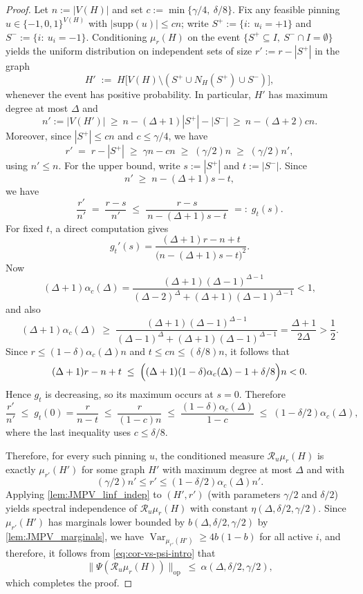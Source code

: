 \documentclass[11pt,reqno,letterpaper]{amsart}
\DeclareMathOperator*{\op}{\textrm{op}}
\newcommand{\supp}{\text{supp}}
\numberwithin{equation}{section}
\theoremstyle{definition}
\newcommand{\mc}{\mathcal}
\newcommand{\on}{\operatorname}
\begin{document}
\begin{proof}
Let $n:=|V(H)|$ and set $c:=\min\{\gamma/4,\ \delta/8\}$.
Fix any feasible pinning $u\in\{-1,0,1\}^{V(H)}$ with $|\supp(u)|\le cn$; write
$S^+:=\{i:\ u_i=+1\}$ and $S^-:=\{i:\ u_i=-1\}$.
Conditioning $\mu_r(H)$ on the event $\{S^+\subseteq I,\ S^-\cap I=\emptyset\}$ yields the uniform
distribution on independent sets of size $r':=r-|S^+|$ in the graph
\[
H' \;:=\; H\big[V(H)\setminus (S^+\cup N_H(S^+)\cup S^-)\big],
\]
whenever the event has positive probability.
In particular, $H'$ has maximum degree at most $\Delta$ and
\[
n':=|V(H')|
\ \ge\ n-(\Delta+1)|S^+|-|S^-|
\ \ge\ n-(\Delta+2)cn.
\]
Moreover, since $|S^+|\le cn$ and $c\le \gamma/4$, we have
\[
r' \;=\; r-|S^+| \;\ge\; \gamma n - cn \;\ge\; (\gamma/2)n \;\ge\; (\gamma/2)n',
\]
using $n'\le n$. For the upper bound, write $s:=|S^+|$ and $t:=|S^-|$. Since
\[
n' \;\ge\; n-(\Delta+1)s-t,
\]
we have
\[
\frac{r'}{n'}
\;=\;
\frac{r-s}{n'}
\;\le\;
\frac{r-s}{\,n-(\Delta+1)s-t\,}
\;=:\;
g_t(s).
\]
For fixed $t$, a direct computation gives
\[
g_t'(s)
=
\frac{(\Delta+1)r-n+t}{\bigl(n-(\Delta+1)s-t\bigr)^2}.
\]
Now
\[
(\Delta+1)\alpha_c(\Delta)
=
\frac{(\Delta+1)(\Delta-1)^{\Delta-1}}
{(\Delta-2)^{\Delta}+(\Delta+1)(\Delta-1)^{\Delta-1}}
<1,
\]
and also
\[
(\Delta+1)\alpha_c(\Delta)
\;\ge\;
\frac{(\Delta+1)(\Delta-1)^{\Delta-1}}
{(\Delta-1)^{\Delta}+(\Delta+1)(\Delta-1)^{\Delta-1}}
=
\frac{\Delta+1}{2\Delta}
>
\frac12.
\]
Since $r\le (1-\delta)\alpha_c(\Delta)n$ and $t\le cn\le (\delta/8)n$, it follows that
\[
(\Delta+1)r-n+t
\;\le\;
\Bigl((\Delta+1)(1-\delta)\alpha_c(\Delta)-1+\delta/8\Bigr)n
<0.
\]
Hence $g_t$ is decreasing, so its maximum occurs at $s=0$. Therefore
\[
\frac{r'}{n'}
\;\le\;
g_t(0)
=
\frac{r}{n-t}
\;\le\;
\frac{r}{(1-c)n}
\;\le\;
\frac{(1-\delta)\alpha_c(\Delta)}{1-c}
\;\le\;
(1-\delta/2)\alpha_c(\Delta),
\]
where the last inequality uses $c\le \delta/8$.


Therefore, for every such pinning $u$, the conditioned measure $\mc R_u\mu_r(H)$ is exactly
$\mu_{r'}(H')$ for some graph $H'$ with maximum degree at most $\Delta$ and with
\[
(\gamma/2)n' \le r' \le (1-\delta/2)\alpha_c(\Delta)n'.
\]
Applying \cref{lem:JMPV_linf_indep} to $(H',r')$ (with parameters $\gamma/2$ and $\delta/2$) yields
spectral independence of $\mc R_u\mu_r(H)$ with constant $\eta(\Delta,\delta/2,\gamma/2)$. Since $\mu_{r'}(H')$ has marginals lower bounded by $b(\Delta, \delta/2, \gamma/2)$ by \cref{lem:JMPV_marginals}, we have $\on{Var}_{\mu_{r'}(H')} \geq 4b(1-b)$ for all active $i$, and therefore, it follows from \cref{eq:cor-vs-psi-intro} that
\[
\|\Psi(\mc R_u\mu_r(H))\|_{\op}\ \le\ \alpha(\Delta,\delta/2,\gamma/2),
\]
which completes the proof. 
\end{proof}
\end{document}

